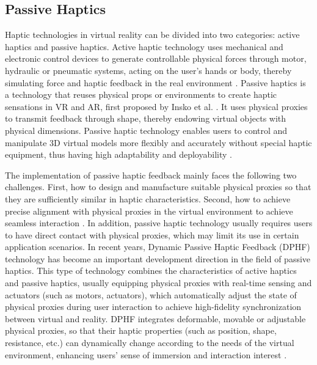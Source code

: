 \documentclass[runningheads]{llncs}
\begin{document}
\subsection{Passive Haptics}
Haptic technologies in virtual reality can be divided into two categories: active haptics and passive haptics. Active haptic technology uses mechanical and electronic control devices to generate controllable physical forces through motor, hydraulic or pneumatic systems, acting on the user's hands or body, thereby simulating force and haptic feedback in the real environment \cite{vaghela2021active}. Passive haptics is a technology that reuses physical props or environments to create haptic sensations in VR and AR, first proposed by Insko et al. \cite{insko2001passive}. It uses physical proxies to transmit feedback through shape, thereby endowing virtual objects with physical dimensions. Passive haptic technology enables users to control and manipulate 3D virtual models more flexibly and accurately without special haptic equipment, thus having high adaptability and deployability \cite{henderson2008opportunistic,shapira2016tactilevr,10.1145/3313831.3376313}.

The implementation of passive haptic feedback mainly faces the following two challenges. First, how to design and manufacture suitable physical proxies so that they are sufficiently similar in haptic characteristics. Second, how to achieve precise alignment with physical proxies in the virtual environment to achieve seamless interaction \cite{zenner2021combining}. In addition, passive haptic technology usually requires users to have direct contact with physical proxies, which may limit its use in certain application scenarios. In recent years, Dynamic Passive Haptic Feedback (DPHF) technology has become an important development direction in the field of passive haptics. This type of technology combines the characteristics of active haptics and passive haptics, usually equipping physical proxies with real-time sensing and actuators (such as motors, actuators), which automatically adjust the state of physical proxies during user interaction to achieve high-fidelity synchronization between virtual and reality. DPHF integrates deformable, movable or adjustable physical proxies, so that their haptic properties (such as position, shape, resistance, etc.) can dynamically change according to the needs of the virtual environment, enhancing users' sense of immersion and interaction interest \cite{zenner2017shifty}.
\end{document}
